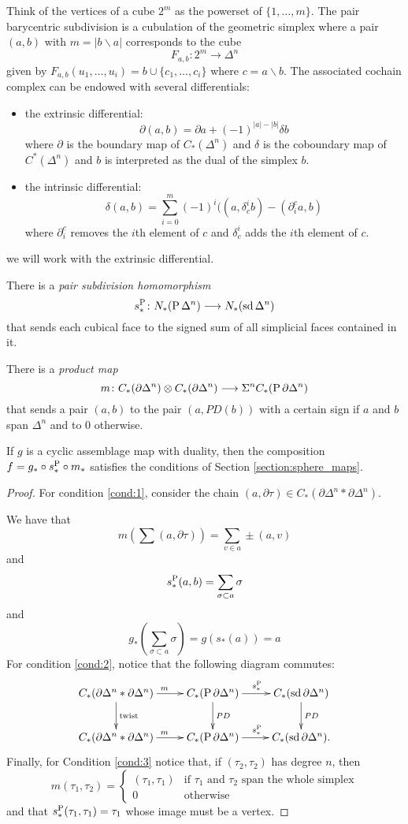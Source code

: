 Think of the vertices of a cube $2^m$ as the powerset of $\{1,\ldots,m\}$. The pair barycentric subdivision is a cubulation of the geometric simplex where a pair $(a,b)$ with $m=|b\smallsetminus a|$ corresponds to the cube
\[F_{a,b}\colon 2^{m}\to \Delta^n\]
given by $F_{a,b}(u_1,\ldots,u_i) = b\cup \{c_1,\ldots,c_i\}$ where $c=a\smallsetminus b$. The associated cochain complex can be endowed with several differentials:
\begin{itemize}
\item the extrinsic differential:
\[\partial(a,b) = \partial a + (-1)^{|a|-|b|} \delta b\]
where $\partial$ is the boundary map of $C_*(\Delta^n)$ and $\delta$ is the coboundary map of $C^*(\Delta^n)$ and $b$ is interpreted as the dual of the simplex $b$.
\item the intrinsic differential:
\[\delta(a,b) = \sum_{i=0}^m (-1)^i((a,\delta^i_c b)-(\partial^c_i a,b)\]
where $\partial_i^c$ removes the $i$th element of $c$ and $\delta^i_c$ adds the $i$th element of $c$.
\end{itemize}
we will work with the extrinsic differential.

There is a \emph{pair subdivision homomorphism}
\[s_*^{\operatorname{P}}\colon N_*(\operatorname{P} \Delta^n)\longrightarrow N_*(\operatorname{sd} \Delta^n)\]
that sends each cubical face to the signed sum of all simplicial faces contained in it.

There is a \emph{product map}
\[m\colon C_*(\partial \Delta^n)\otimes C_*(\partial \Delta^n)\longrightarrow \Sigma^n C_*(\operatorname{P} \partial \Delta^n) \]
that sends a pair $(a,b)$ to the pair $(a,PD(b))$ with a certain sign if $a$ and $b$ span $\Delta^n$ and to $0$ otherwise.

\begin{proposition}
    If $g$ is a cyclic assemblage map with duality, then the composition $f = g_*\circ s_*^{\operatorname{P}}\circ m_*$ satisfies the conditions of Section \ref{section:sphere_maps}.
\end{proposition}
\begin{proof}
For condition \ref{cond:1}, consider the chain $(a,\partial \tau)\in C_*(\partial \Delta^n*\partial \Delta^n)$.

We have that
\[
m\left(\sum (a,\partial \tau)\right) = \sum_{v\in a} \pm(a,v)
\]
and
\[
s^{\operatorname{P}}_*(a,b) = \sum_{\sigma\subset a} \sigma
\]
and
\[g_*\left(\sum_{\sigma\subset a} \sigma\right) = g(s_*(a)) = a
\]
For condition \ref{cond:2}, notice that the following diagram commutes:
\[\xymatrix{
C_*(\partial \Delta^n*\partial\Delta^n)\ar[r]^m\ar[d]^{\text{twist}} &C_*(\Psd \partial \Delta^n) \ar[r]^{s_*^{\Psd}}\ar[d]^{PD}& C_*(\sd \partial \Delta^n)\ar[d]^{PD}\\
C_*(\partial \Delta^n*\partial\Delta^n)\ar[r]^m &C_*(\Psd \partial \Delta^n) \ar[r]^{s_*^{\Psd}}& C_*(\sd \partial \Delta^n).
}\]
Finally, for Condition \ref{cond:3} notice that, if $(\tau_2,\tau_2)$ has degree $n$, then
\[m(\tau_1,\tau_2) =
\begin{cases}
(\tau_1,\tau_1) & \text{if $\tau_1$ and $\tau_2$ span the whole simplex} \\
0 & \text{otherwise}
\end{cases}
\]
and that $s^{\operatorname{P}}_*(\tau_1,\tau_1) = \tau_1$ whose image must be a vertex.
\end{proof}

